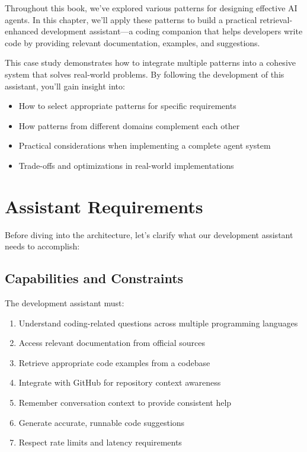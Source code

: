 \documentclass[11pt,oneside]{book}
\providecommand{\tightlist}{%
  \setlength{\itemsep}{0pt}\setlength{\parskip}{0pt}}
\begin{document}
Throughout this book, we've explored various patterns for designing
effective AI agents. In this chapter, we'll apply these patterns to
build a practical retrieval-enhanced development assistant---a coding
companion that helps developers write code by providing relevant
documentation, examples, and suggestions.

This case study demonstrates how to integrate multiple patterns into a
cohesive system that solves real-world problems. By following the
development of this assistant, you'll gain insight into:

\begin{itemize}
\tightlist
\item
  How to select appropriate patterns for specific requirements
\item
  How patterns from different domains complement each other
\item
  Practical considerations when implementing a complete agent system
\item
  Trade-offs and optimizations in real-world implementations
\end{itemize}

\section{Assistant Requirements}\label{assistant-requirements}

Before diving into the architecture, let's clarify what our development
assistant needs to accomplish:

\subsection{Capabilities and
Constraints}\label{capabilities-and-constraints}

The development assistant must:

\begin{enumerate}
\def\labelenumi{\arabic{enumi}.}
\tightlist
\item
  Understand coding-related questions across multiple programming
  languages
\item
  Access relevant documentation from official sources
\item
  Retrieve appropriate code examples from a codebase
\item
  Integrate with GitHub for repository context awareness
\item
  Remember conversation context to provide consistent help
\item
  Generate accurate, runnable code suggestions
\item
  Respect rate limits and latency requirements
\end{enumerate}
\end{document}
